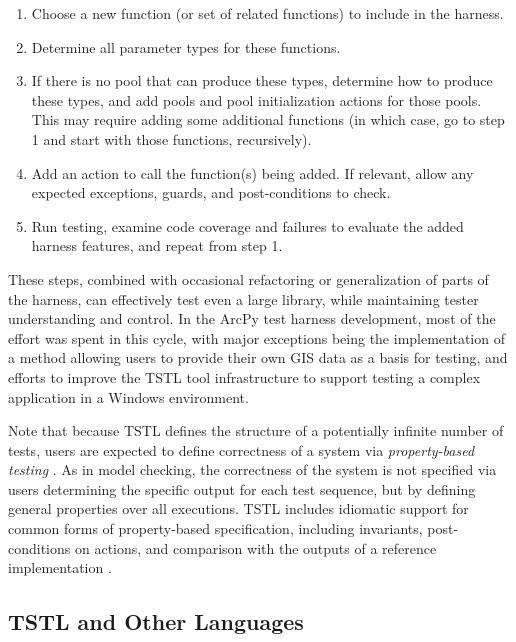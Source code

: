 \begin{enumerate}
\item Choose a new function (or set of related functions) to include
  in the harness.
\item Determine all parameter types for these functions.
\item If there is no pool that can produce these types, determine how
  to produce these types, and add pools and pool initialization actions for
  those pools.  This may require adding some additional
  functions (in which case, go to step 1 and start with those
  functions, recursively).
\item Add an action to call the function(s) being added.  If relevant,
  allow any expected exceptions, guards, and post-conditions to check.
\item Run testing, examine code coverage and failures to evaluate the
  added harness features, and repeat from step 1.
\end{enumerate}

These steps, combined with occasional refactoring or generalization of
parts of the harness, can effectively test even a large library, while
maintaining tester understanding and control.   In the ArcPy test
harness development, most of the effort was spent in this cycle, with
major exceptions being the implementation of a method allowing users
to provide their own GIS data as a basis for testing, and efforts to
improve the TSTL tool infrastructure to support testing a complex
application in a Windows environment.


Note that because TSTL defines the structure of a potentially infinite
number of tests, users are expected to define correctness of a system
via \emph{property-based testing} \cite{ClaessenH00}.  As in
model checking, the correctness of the system is not specified via users
determining the specific output for each test sequence, but by
defining general properties over all executions.  TSTL includes
idiomatic support for common forms of property-based specification,
including invariants, post-conditions on actions, and comparison with
the outputs of a reference implementation \cite{Differential}.

\subsection{TSTL and Other Languages}

